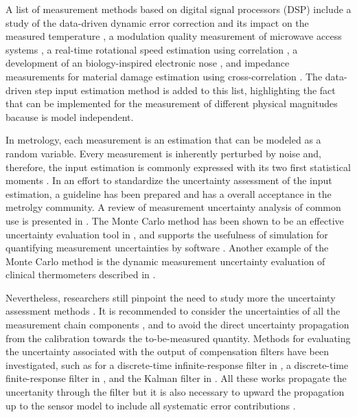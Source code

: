 A list of measurement methods based on digital signal processors (DSP) include 
a study of the data-driven dynamic error correction and its impact on the measured temperature \citep{Saggin01},
a modulation quality measurement of microwave access systems \citep{Angrisani10}, 
a real-time rotational speed estimation using correlation \citep{Wang14},
a development of an biology-inspired electronic nose \citep{Jing16},
and impedance measurements for material damage estimation using cross-correlation \citep{deCastro19}.
The data-driven step input estimation method \citep{Markovsky15cep} is added to this list, highlighting the fact that can be implemented for the measurement of different physical magnitudes bacause is model independent.


In metrology, each measurement is an estimation that can be modeled as a random variable.
Every measurement is inherently perturbed by noise and, therefore, the input estimation is commonly expressed with its two first statistical moments \citep{Ferrero06}.
In an effort to standardize the uncertainty assessment of the input estimation, a guideline \citep{GUM08}has been prepared and has a overall acceptance in the metrolgy community.
A review of measurement uncertainty analysis of common use is presented in \citep{daSilva12}.
The Monte Carlo method has been shown to be an effective uncertainty evaluation tool in \citep{Cox06},
and supports the usefulness of simulation for quantifying measurement uncertainties by software \citep{Esward16}.
Another example of the Monte Carlo method is the dynamic measurement uncertainty evaluation of clinical thermometers described in \citep{Ogorevc16}.

Nevertheless, researchers still pinpoint the need to study more the uncertainty assessment methods \citep{Esward09, Hessling10}.
It is recommended to consider the uncertainties of all the measurement chain components \citep{Diniz17}, and to avoid the direct uncertainty propagation from the calibration towards the to-be-measured quantity.  
Methods for evaluating the uncertainty associated with the output of compensation filters have been investigated, such as for
a discrete-time infinite-response filter in \citep{Link09},
a discrete-time finite-response filter in \citep{Elster07, Elster08}, and
the Kalman filter in \citep{Eichstadt16b}.
All these works propagate the uncertanity through the filter but it is also necessary to upward the propagation up to the sensor model to include all systematic error contributions \citep{Hessling11}.



